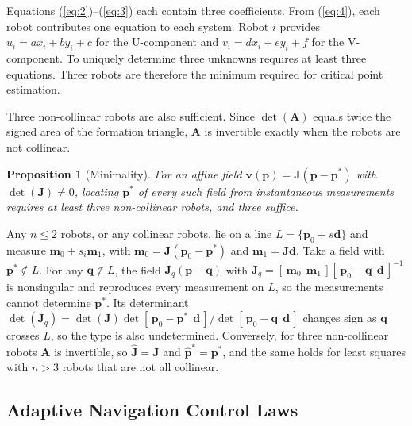 \documentclass[lettersize,journal]{IEEEtran}
\newtheorem{proposition}{Proposition}
\begin{document}
Equations (\ref{eq:2})--(\ref{eq:3}) each contain three coefficients. From (\ref{eq:4}), each robot contributes one equation to each system. Robot $i$ provides $u_i = ax_i + by_i + c$ for the U-component and $v_i = dx_i + ey_i + f$ for the V-component. To uniquely determine three unknowns requires at least three equations. Three robots are therefore the minimum required for critical point estimation.


Three non-collinear robots are also sufficient. Since $\det(\mathbf{A})$ equals twice the signed area of the formation triangle, $\mathbf{A}$ is invertible exactly when the robots are not collinear.

\begin{proposition}[Minimality]\label{prop:min}
For an affine field $\mathbf{v}(\mathbf{p}) = \mathbf{J}(\mathbf{p}-\mathbf{p}^*)$ with $\det(\mathbf{J}) \neq 0$, locating $\mathbf{p}^*$ of every such field from instantaneous measurements requires at least three non-collinear robots, and three suffice.
\end{proposition}

\begin{IEEEproof}
Any $n \le 2$ robots, or any collinear robots, lie on a line $L = \{\mathbf{p}_0 + s\mathbf{d}\}$ and measure $\mathbf{m}_0 + s_i\mathbf{m}_1$, with $\mathbf{m}_0 = \mathbf{J}(\mathbf{p}_0 - \mathbf{p}^*)$ and $\mathbf{m}_1 = \mathbf{J}\mathbf{d}$. Take a field with $\mathbf{p}^* \notin L$. For any $\mathbf{q} \notin L$, the field $\mathbf{J}_q(\mathbf{p} - \mathbf{q})$ with $\mathbf{J}_q = [\,\mathbf{m}_0\ \ \mathbf{m}_1\,][\,\mathbf{p}_0 - \mathbf{q}\ \ \mathbf{d}\,]^{-1}$ is nonsingular and reproduces every measurement on $L$, so the measurements cannot determine $\mathbf{p}^*$. Its determinant $\det(\mathbf{J}_q) = \det(\mathbf{J})\det[\,\mathbf{p}_0 - \mathbf{p}^*\ \ \mathbf{d}\,]/\det[\,\mathbf{p}_0 - \mathbf{q}\ \ \mathbf{d}\,]$ changes sign as $\mathbf{q}$ crosses $L$, so the type is also undetermined. Conversely, for three non-collinear robots $\mathbf{A}$ is invertible, so $\hat{\mathbf{J}} = \mathbf{J}$ and $\hat{\mathbf{p}}^* = \mathbf{p}^*$, and the same holds for least squares with $n > 3$ robots that are not all collinear.
\end{IEEEproof}


\subsection{Adaptive Navigation Control Laws}
\label{sec:control_primitives}
\end{document}
